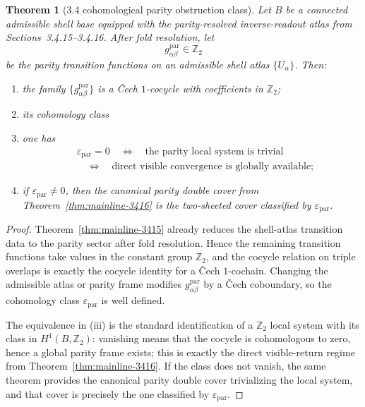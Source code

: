 \documentclass[12pt,a4paper]{article}
\newtheorem{theorem}{Theorem}[section]
\begin{document}
\begin{theorem}[3.4 cohomological parity obstruction class]
\label{thm:mainline-3417}
Let $B$ be a connected admissible shell base equipped with the parity-resolved inverse-readout atlas from Sections~3.4.15--3.4.16. After fold resolution, let
\[
 g^{\mathrm{par}}_{\alpha\beta}\in \mathbb Z_2
\]
be the parity transition functions on an admissible shell atlas $\{U_\alpha\}$. Then:
\begin{enumerate}[label=(\roman*)]
 \item the family $\{g^{\mathrm{par}}_{\alpha\beta}\}$ is a \v{C}ech $1$-cocycle with coefficients in $\mathbb Z_2$;
 \item its cohomology class
 \item one has
 \[
 \begin{aligned}
 &\varepsilon_{\mathrm{par}}=0
 \quad\Longleftrightarrow\quad
 \text{the parity local system is trivial}\\[0.2em]
 &\quad\Longleftrightarrow\quad
 \text{direct visible convergence is globally available};
 \end{aligned}
 \]
 \item if $\varepsilon_{\mathrm{par}}\neq 0$, then the canonical parity double cover from Theorem~\ref{thm:mainline-3416} is the two-sheeted cover classified by $\varepsilon_{\mathrm{par}}$.
\end{enumerate}
\end{theorem}

\begin{proof}
Theorem~\ref{thm:mainline-3415} already reduces the shell-atlas transition data to the parity sector after fold resolution. Hence the remaining transition functions take values in the constant group $\mathbb Z_2$, and the cocycle relation on triple overlaps is exactly the cocycle identity for a \v{C}ech $1$-cochain. Changing the admissible atlas or parity frame modifies $g^{\mathrm{par}}_{\alpha\beta}$ by a \v{C}ech coboundary, so the cohomology class $\varepsilon_{\mathrm{par}}$ is well defined.

The equivalence in (iii) is the standard identification of a $\mathbb Z_2$ local system with its class in $H^1(B,\mathbb Z_2)$: vanishing means that the cocycle is cohomologous to zero, hence a global parity frame exists; this is exactly the direct visible-return regime from Theorem~\ref{thm:mainline-3416}. If the class does not vanish, the same theorem provides the canonical parity double cover trivializing the local system, and that cover is precisely the one classified by $\varepsilon_{\mathrm{par}}$.
\end{proof}
\end{document}
